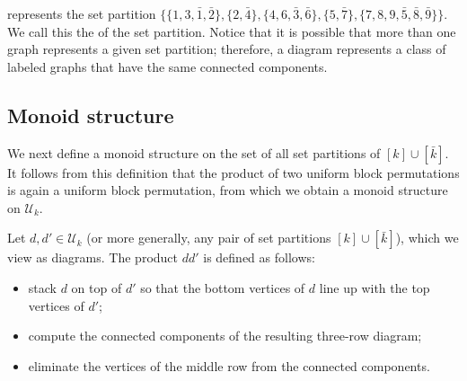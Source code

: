 represents the set partition $\{ \{1,3,\bar{1},\bar{2} \}, \{2,\bar{4} \}, \{4,6,\bar{3}, \bar{6}\}, \{5,\bar{7} \}, \{7, 8, 9, \bar{5}, \bar{8}, \bar{9} \}  \}$.
We call this the  of the set partition.
Notice that it is possible that more than one graph represents a given set
partition; therefore, a diagram represents a class of labeled graphs that have
the same connected components.

\subsection{Monoid structure}
\label{sec:monoidstructure}
We next define a monoid structure on the set of all set partitions of $[k] \cup
[\bar{k}]$. It follows from this definition that the product of two uniform
block permutations is again a uniform block permutation, from which we obtain
a monoid structure on $\mathcal{U}_k$.

Let $d, d' \in \mathcal{U}_k$ (or more generally, any pair of set partitions
$[k] \cup [\bar{k}]$), which we view as diagrams. The product $d d'$ is defined
as follows:
\begin{itemize}
    \item
        stack $d$ on top of $d'$ so that the bottom vertices of $d$
        line up with the top vertices of $d'$;

    \item
        compute the connected components of the resulting three-row diagram;

    \item
        eliminate the vertices of the middle row from the connected components.
\end{itemize}

